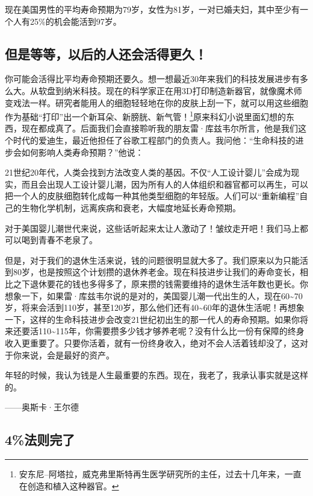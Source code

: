 现在美国男性的平均寿命预期为79岁，女性为81岁，一对已婚夫妇，其中至少有一个人有25\%的机会能活到97岁。

\subsection{但是等等，以后的人还会活得更久！}

你可能会活得比平均寿命预期还要久。想一想最近30年来我们的科技发展进步有多么大。从软盘到纳米科技。现在的科学家正在用3D打印制造新器官，就像魔术师变戏法一样。研究者能用人的细胞轻轻地在你的皮肤上刮一下，就可以用这些细胞作为基础“打印”出一个新耳朵、新膀胱、新气管！\footnote{\label{fn:pdf-28-2}安东尼–阿塔拉，威克弗里斯特再生医学研究所的主任，过去十几年来，一直在创造和植入这种器官。}原来科幻小说里面幻想的东西，现在都成真了。后面我们会直接聆听我的朋友雷·库兹韦尔所言，他是我们这个时代的爱迪生，最近他担任了谷歌工程部门的负责人。我问他：“生命科技的进步会如何影响人类寿命预期？”他说：

21世纪20年代，人类会找到方法改变人类的基因。不仅“人工设计婴儿”会成为现实，而且会出现人工设计婴儿潮，因为所有人的人体组织和器官都可以再生，可以把一个人的皮肤细胞转化成每一种其他类型细胞的年轻版。人们可以“重新编程”自己的生物化学机制，远离疾病和衰老，大幅度地延长寿命预期。

对于美国婴儿潮世代来说，这些话听起来太让人激动了！皱纹走开吧！我们马上都可以喝到青春不老泉了。

但是，对于我们的退休生活来说，钱的问题很明显就大多了。我们原来以为只能活到80岁，也是按照这个计划攒的退休养老金。现在科技进步让我们的寿命变长，相比之下退休要花的钱也多得多了，原来攒的钱需要维持的退休生活年数也更长。你想象一下，如果雷·库兹韦尔说的是对的，美国婴儿潮一代出生的人，现在60\textasciitilde{}70岁，将来会活到110岁，甚至120岁，那么他们还有40\textasciitilde{}60年的退休生活呢！再想象一下，这样的生命科技进步会改变21世纪初出生的那一代人的寿命预期。如果你将来还要活110\textasciitilde{}115年，你需要攒多少钱才够养老呢？没有什么比一份有保障的终身收入更重要了。只要你活着，就有一份终身收入，绝对不会人活着钱却没了，这对于你来说，会是最好的资产。

\begin{BookQuote}
年轻的时候，我认为钱是人生最重要的东西。现在，我老了，我承认事实就是这样的。

\hfill ——奥斯卡·王尔德
\end{BookQuote}

\subsection{4\%法则完了}

